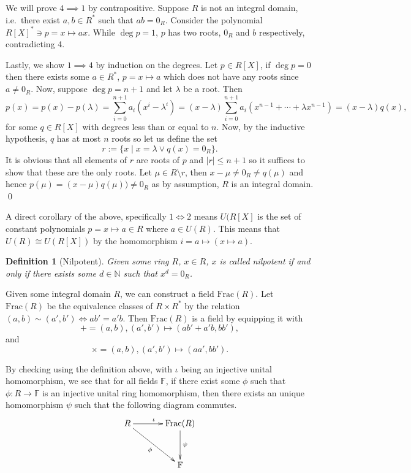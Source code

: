 \documentclass[
]{article}
\newtheorem{definition}{Definition}[theorem]
\begin{document}
We will prove \(4 \implies 1\) by contrapositive. Suppose \(R\) is not
an integral domain, i.e.~there exist \(a, b \in R^*\) such that
\(ab = 0_R\). Consider the polynomial \(R[X]^* \ni p = x \mapsto ax\).
While \(\deg p = 1\), \(p\) has two roots, \(0_R\) and \(b\)
respectively, contradicting 4.

Lastly, we show \(1 \implies 4\) by induction on the degrees. Let
\(p \in R[X]\), if \(\deg p = 0\) then there exists some \(a \in R^*\),
\(p = x \mapsto a\) which does not have any roots since \(a \neq 0_R\).
Now, suppose \(\deg p = n + 1\) and let \(\lambda\) be a root. Then \[
    p(x) = p(x) - p(\lambda) = \sum_{i = 0}^{n + 1} a_i (x^i - \lambda ^ i)
      = (x - \lambda) \sum_{i = 0}^{n + 1} a_i (x^{n - 1} + \cdots + \lambda x ^{n - 1})
      = (x - \lambda) q(x),
  \] for some \(q \in R[X]\) with degrees less than or equal to \(n\).
Now, by the inductive hypothesis, \(q\) has at most \(n\) roots so let
us define the set \[r := \{ x \mid x = \lambda \vee q(x) = 0_R \}. \] It
is obvious that all elements of \(r\) are roots of \(p\) and
\(\mid r \mid \leq n + 1\) so it suffices to show that these are the
only roots. Let \(\mu \in R \setminus r\), then
\(x - \mu \neq 0_R \neq q(\mu)\) and hence
\(p(\mu) = (x - \mu) q(\mu)) \neq 0_R\) as by assumption, \(R\) is an
integral domain. \qed

A direct corollary of the above, specifically \(1 \iff 2\) means
\(U(R[X]\) is the set of constant polynomials \(p = x \mapsto a \in R\)
where \(a \in U(R)\). This means that \(U(R) \cong U(R[X])\) by the
homomorphism \(i = a \mapsto (x \mapsto a)\).

\begin{definition}[Nilpotent]
  Given some ring \(R\), \(x \in R\), \(x\) is called nilpotent if and only if 
  there exists some \(d \in \mathbb{N}\) such that \(x^d = 0_R\).
\end{definition}

Given some integral domain \(R\), we can construct a field
\(\text{Frac}(R)\). Let \(\text{Frac}(R)\) be the equivalence classes of
\(R \times R^*\) by the relation
\((a, b) \sim (a', b') \iff ab' = a'b\). Then \(\text{Frac}(R)\) is a
field by equipping it with
\[+ = (a, b), (a', b') \mapsto (ab' + a'b, bb'),\] and
\[\times = (a, b), (a', b') \mapsto (aa', bb').\]

By checking using the definition above, with \(\iota\) being an
injective unital homomorphism, we see that for all fields
\(\mathbb{F}\), if there exist some \(\phi\) such that
\(\phi : R \to \mathbb{F}\) is an injective unital ring homomorphism,
then there exists an unique homomorphism \(\psi\) such that the
following diagram commutes. \[
\xymatrix @ R=1.2cm @ C=1.2cm {
 R \ar[r]^{\iota} \ar[rd]_{\phi} & \text{Frac}(R) \ar[d]^{\psi} \\
                                 & \mathbb{F} \\
}
\]
\end{document}
